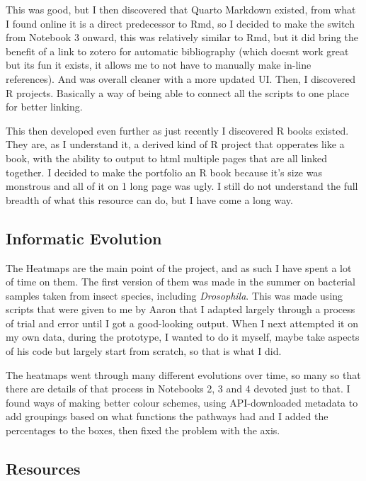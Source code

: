 \documentclass[
  letterpaper,
  DIV=11,
  numbers=noendperiod]{scrreprt}
\begin{document}
This was good, but I then discovered that Quarto Markdown existed, from
what I found online it is a direct predecessor to Rmd, so I decided to
make the switch from Notebook 3 onward, this was relatively similar to
Rmd, but it did bring the benefit of a link to zotero for automatic
bibliography (which doesnt work great but its fun it exists, it allows
me to not have to manually make in-line references). And was overall
cleaner with a more updated UI. Then, I discovered R projects. Basically
a way of being able to connect all the scripts to one place for better
linking.

This then developed even further as just recently I discovered R books
existed. They are, as I understand it, a derived kind of R project that
opperates like a book, with the ability to output to html multiple pages
that are all linked together. I decided to make the portfolio an R book
because it's size was monstrous and all of it on 1 long page was ugly. I
still do not understand the full breadth of what this resource can do,
but I have come a long way.

\subsection{Informatic Evolution}\label{informatic-evolution}

The Heatmaps are the main point of the project, and as such I have spent
a lot of time on them. The first version of them was made in the summer
on bacterial samples taken from insect species, including
\emph{Drosophila}. This was made using scripts that were given to me by
Aaron that I adapted largely through a process of trial and error until
I got a good-looking output. When I next attempted it on my own data,
during the prototype, I wanted to do it myself, maybe take aspects of
his code but largely start from scratch, so that is what I did.

The heatmaps went through many different evolutions over time, so many
so that there are details of that process in Notebooks 2, 3 and 4
devoted just to that. I found ways of making better colour schemes,
using API-downloaded metadata to add groupings based on what functions
the pathways had and I added the percentages to the boxes, then fixed
the problem with the axis.

\subsection{Resources}\label{resources}
\end{document}
